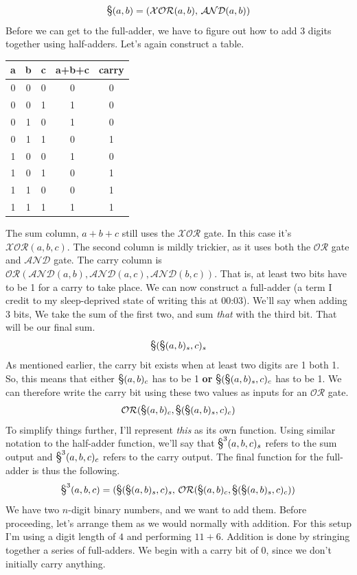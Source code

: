 \documentclass[oneside]{book}
\begin{document}
$$
\hadd(a,b) = (\mathcal{XOR}(a,b),\,  \mathcal{AND}(a,b))
$$
\tab
Before we can get to the full-adder, we have to figure out how to add 3 digits together using half-adders. Let's again construct a table.
\begin{center}
\begin{tabular}{|c|c|c|c|c|}
\hline
a & b & c & a+b+c & carry \\
\hline
0 & 0 & 0 & 0 & 0\\
0 & 0 & 1 & 1 & 0\\
0 & 1 & 0 & 1 & 0\\
0 & 1 & 1 & 0 & 1\\
1 & 0 & 0 & 1 & 0\\
1 & 0 & 1 & 0 & 1\\
1 & 1 & 0 & 0 & 1\\
1 & 1 & 1 & 1 & 1\\
\hline
\end{tabular}
\end{center}
\tab
The sum column, $a+b+c$ still uses the $\mathcal{XOR}$ gate. In this case it's $\mathcal{XOR}(a,b,c)$. The second column is mildly trickier, as it uses both the $\mathcal{OR}$ gate and $\mathcal{AND}$ gate. The carry column is $\mathcal{OR}(\mathcal{AND}(a,b),\mathcal{AND}(a,c),\mathcal{AND}(b,c))$. That is, at least two bits have to be 1 for a carry to take place. We can now construct a full-adder (a term I credit to my sleep-deprived state of writing this at 00:03). We'll say when adding 3 bits, We take the sum of the first two, and sum \textit{that} with the third bit. That will be our final sum. 
$$
\hadd(\hadd(a,b)_s,c)_s
$$
\tab
As mentioned earlier, the carry bit exists when at least two digits are 1 both 1. So, this means that either $\hadd(a,b)_c$ has to be 1 \textbf{or} $\hadd(\hadd(a,b)_s,c)_c$ has to be 1. We can therefore write the carry bit using these two values as inputs for an $\mathcal{OR}$ gate.
$$
\mathcal{OR}(\hadd(a,b)_c,\hadd(\hadd(a,b)_s,c)_c)
$$
To simplify things further, I'll represent \textit{this} as its own function. Using similar notation to the half-adder function, we'll say that $\hadd^3(a,b,c)_s$ refers to the sum output and $\hadd^3(a,b,c)_c$ refers to the carry output. The final function for the full-adder is thus the following.
$$
\hadd^3(a,b,c) = (\hadd(\hadd(a,b)_s,c)_s,\, \mathcal{OR}(\hadd(a,b)_c,\hadd(\hadd(a,b)_s,c)_c))
$$
\newline
\tab
We have two $n$-digit binary numbers, and we want to add them. Before proceeding, let's arrange them as we would normally with addition. For this setup I'm using a digit length of $4$ and performing $11+6$. Addition is done by stringing together a series of full-adders. We begin with a carry bit of 0, since we don't initially carry anything.
\end{document}

